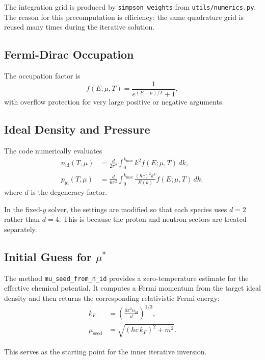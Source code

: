 \documentclass[11pt]{article}
\begin{document}
The integration grid is produced by \texttt{simpson\_weights} from
\texttt{utils/numerics.py}. The reason for this precomputation is efficiency:
the same quadrature grid is reused many times during the iterative solution.

\subsection{Fermi-Dirac Occupation}

The occupation factor is
\begin{equation}
f(E;\mu,T) = \frac{1}{e^{(E-\mu)/T} + 1},
\end{equation}
with overflow protection for very large positive or negative arguments.

\subsection{Ideal Density and Pressure}

The code numerically evaluates
\begin{align}
n_{\mathrm{id}}(T,\mu) &=
\frac{d}{2\pi^2} \int_0^{k_{\max}} k^2 f(E;\mu,T)\, dk, \\
p_{\mathrm{id}}(T,\mu) &=
\frac{d}{6\pi^2} \int_0^{k_{\max}}
\frac{(\hbar c)^2 k^4}{E(k)} f(E;\mu,T)\, dk,
\end{align}
where $d$ is the degeneracy factor.

In the fixed-$y$ solver, the settings are modified so that each species uses
$d=2$ rather than $d=4$. This is because the proton and neutron sectors are
treated separately.

\subsection{Initial Guess for \texorpdfstring{$\mu^\ast$}{mu*}}

The method \texttt{mu\_seed\_from\_n\_id} provides a zero-temperature estimate
for the effective chemical potential. It computes a Fermi momentum from the
target ideal density and then returns the corresponding relativistic Fermi
energy:
\begin{align}
k_F &= \left(\frac{6\pi^2 n_{\mathrm{id}}}{d}\right)^{1/3}, \\
\mu_{\text{seed}} &= \sqrt{(\hbar c\, k_F)^2 + m^2}.
\end{align}

This serves as the starting point for the inner iterative inversion.
\end{document}
